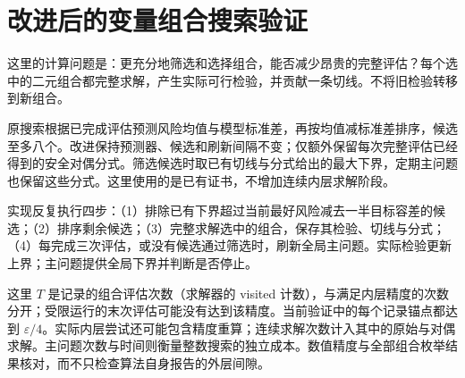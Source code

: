 \documentclass[11pt,a4paper]{article}
\begin{document}
\section{改进后的变量组合搜索验证}\label{sec:search}
这里的计算问题是：更充分地筛选和选择组合，能否减少昂贵的完整评估？每个选中的二元组合都完整求解，产生实际可行检验，并贡献一条切线。不将旧检验转移到新组合。

原搜索根据已完成评估预测风险均值与模型标准差，再按均值减标准差排序，候选至多八个。改进保持预测器、候选和刷新间隔不变；仅额外保留每次完整评估已经得到的安全对偶分式。筛选候选时取已有切线与分式给出的最大下界，定期主问题也保留这些分式。这里使用的是已有证书，不增加连续内层求解阶段。

实现反复执行四步：（1）排除已有下界超过当前最好风险减去一半目标容差的候选；（2）排序剩余候选；（3）完整求解选中的组合，保存其检验、切线与分式；（4）每完成三次评估，或没有候选通过筛选时，刷新全局主问题。实际检验更新上界；主问题提供全局下界并判断是否停止。

这里 $T$ 是记录的组合评估次数（求解器的 visited 计数），与满足内层精度的次数分开；受限运行的末次评估可能没有达到该精度。当前验证中的每个记录锚点都达到 $\varepsilon/4$。实际内层尝试还可能包含精度重算；连续求解次数计入其中的原始与对偶求解。主问题次数与时间则衡量整数搜索的独立成本。数值精度与全部组合枚举结果核对，而不只检查算法自身报告的外层间隙。
\end{document}

